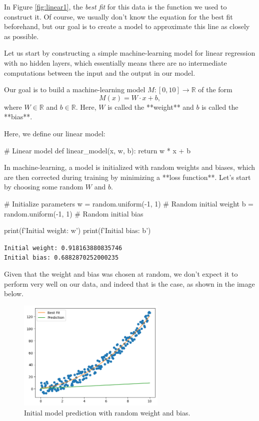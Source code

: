 In Figure \ref{fig:linear1}, the \textit{best fit} for this data is the function we used to construct it. Of course, we usually don't know the equation for the best fit beforehand, but our goal is to create a model to approximate this line as closely as possible. 

Let us start by constructing a simple machine-learning model for linear regression with no hidden layers, which essentially means there are no intermediate computations between the input and the output in our model.

Our goal is to build a machine-learning model 
$M:[0,10]\to\mathbb{R}$ of the form $$M(x) = W\cdot x + b,$$ where $W\in\mathbb{R}$ and $b\in\mathbb{R}$. Here, $W$ is called the **weight** and $b$ is called the **bias**.   

Here, we define our linear model:

\begin{codeblock}
# Linear model
def linear_model(x, w, b):
    return w * x + b
\end{codeblock}

In machine-learning, a model is initialized with random weights and biases, which are then corrected during training by minimizing a **loss function**. Let's start by choosing some random $W$ and $b$.

\begin{codeblock}
# Initialize parameters
w = random.uniform(-1, 1)  # Random initial weight
b = random.uniform(-1, 1)  # Random initial bias


print(f'Initial weight: {w}')
print(f'Initial bias: {b}')
\end{codeblock}
\texttt{Initial weight: 0.918163880835746\\
Initial bias: 0.6882870252000235}

Given that the weight and bias was chosen at random, we don't expect it to perform very well on our data, and indeed that is the case, as shown in the image below.

\begin{figure}[H]
\centering
\includegraphics[width=200pt]{Regression/img/output_6_0.png}
\caption{Initial model prediction with random weight and bias.}
\label{fig:linear2}
\end{figure}

